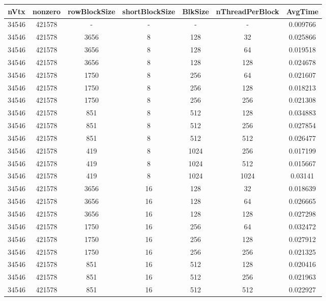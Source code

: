 \documentclass[9pt]{article}
\begin{document}
\SetBgPosition{0.25cm,-5.0cm}
\begin{tabular}{|c|c|c|c|c|c|c| }  
\hline
nVtx  & nonzero  & rowBlockSize  & shortBlockSize  & BlkSize  & nThreadPerBlock  & AvgTime \\
\hline
34546  & 421578  &  -  & -  & -  & -  &0.009766 \\
\hline
34546  & 421578  & 3656  & 8  & 128  & 32  & 0.025866 \\
\hline
34546  & 421578  & 3656  & 8  & 128  & 64  & 0.019518 \\
\hline
34546  & 421578  & 3656  & 8  & 128  & 128  & 0.024678 \\
\hline
34546  & 421578  & 1750  & 8  & 256  & 64  & 0.021607 \\
\hline
34546  & 421578  & 1750  & 8  & 256  & 128  & 0.018213 \\
\hline
34546  & 421578  & 1750  & 8  & 256  & 256  & 0.021308 \\
\hline
34546  & 421578  & 851  & 8  & 512  & 128  & 0.034883 \\
\hline
34546  & 421578  & 851  & 8  & 512  & 256  & 0.027854 \\
\hline
34546  & 421578  & 851  & 8  & 512  & 512  & 0.026477 \\
\hline
34546  & 421578  & 419  & 8  & 1024  & 256  & 0.017199 \\
\hline
34546  & 421578  & 419  & 8  & 1024  & 512  & 0.015667 \\
\hline
34546  & 421578  & 419  & 8  & 1024  & 1024  & 0.03141 \\
\hline
34546  & 421578  & 3656  & 16  & 128  & 32  & 0.018639 \\
\hline
34546  & 421578  & 3656  & 16  & 128  & 64  & 0.026665 \\
\hline
34546  & 421578  & 3656  & 16  & 128  & 128  & 0.027298 \\
\hline
34546  & 421578  & 1750  & 16  & 256  & 64  & 0.032472 \\
\hline
34546  & 421578  & 1750  & 16  & 256  & 128  & 0.027912 \\
\hline
34546  & 421578  & 1750  & 16  & 256  & 256  & 0.021325 \\
\hline
34546  & 421578  & 851  & 16  & 512  & 128  & 0.020416 \\
\hline
34546  & 421578  & 851  & 16  & 512  & 256  & 0.021963 \\
\hline
34546  & 421578  & 851  & 16  & 512  & 512  & 0.022927 \\

\end{tabular}
\end{document}
